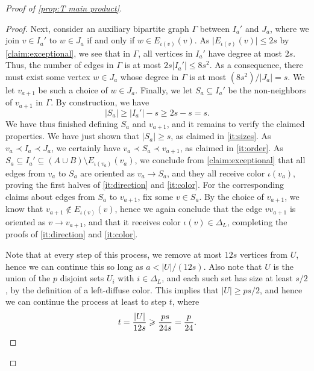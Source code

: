 \documentclass[11pt,reqno]{amsart}
\theoremstyle{definition}
\newcommand\ab[1]{\lvert#1\rvert}
\newcommand\1{\mathbf{1}}
\let\leq\leqslant
\let\geq\geqslant
\begin{document}
\begin{proof}[Proof of \cref{prop:T main product}]
\begin{proof}
        Next, consider an auxiliary bipartite graph $\Gamma$ between $I_a'$ and $J_a$, where we join $v \in I_a'$ to $w \in J_a$ if and only if $w \in E_{\iota(v)}(v)$. As $\ab{E_{\iota(v)}(v)}\leq 2s$ by \cref{claim:exceptional}, we see that in $\Gamma$, all vertices in $I_a'$ have degree at most $2s$. Thus, the number of edges in $\Gamma$ is at most $2s\ab{I_a'} \leq 8s^2$. As a consequence, there must exist some vertex $w \in J_a$ whose degree in $\Gamma$ is at most $(8s^2)/\ab{J_a}=s$. We let $v_{a+1}$ be such a choice of $w \in J_a$. Finally, we let $S_a\subseteq I_a'$ be the non-neighbors of $v_{a+1}$ in $\Gamma$. By construction, we have
        \[
            \ab{S_a} \geq \ab{I_a'}-s \geq 2s-s=s.
        \]
        We have thus finished defining $S_a$ and $v_{a+1}$, and it remains to verify the claimed properties. We have just shown that $\ab{S_a}\geq s$, as claimed in \ref{it:sizes}. As $v_a \prec I_a \prec J_a$, we certainly have $v_a \prec S_a \prec v_{a+1}$, as claimed in \ref{it:order}. As $S_a \subseteq I_a' \subseteq (A\cup B) \setminus E_{\iota(v_a)}(v_a)$, we conclude from \cref{claim:exceptional} that all edges from $v_a$ to $S_a$ are oriented as $v_a \to S_a$, and they all receive color $\iota(v_a)$, proving the first halves of \ref{it:direction} and \ref{it:color}. For the corresponding claims about edges from $S_a$ to $v_{a+1}$, fix some $v \in S_a$. By the choice of $v_{a+1}$, we know that $v_{a+1} \notin E_{\iota(v)}(v)$, hence we again conclude that the edge $vv_{a+1}$ is oriented as $v \to v_{a+1}$, and that it receives color $\iota(v)\in \Delta_L$, completing the proofs of \ref{it:direction} and \ref{it:color}.

        Note that at every step of this process, we remove at most $12s$ vertices from $U$, hence we can continue this so long as $a<\ab U/(12s)$. Also note that $U$ is the union of the $p$ disjoint sets $U_i$ with $i \in \Delta_L$, and each such set has size at least $s/2$, by the definition of a left-diffuse color. This implies that $\ab U \geq ps/2$, and hence we can continue the process at least to step $t$, where
        \[
            t = \frac{\ab U}{12 s} \geq \frac{ps}{24s} = \frac{p}{24}.\qedhere
        \]
    \end{proof}




\end{proof}
\end{document}
